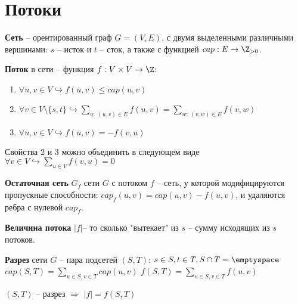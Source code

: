 \section{Потоки}%
\label{sec:Потоки}

\begin{Def}
	\textbf{Сеть} -- орентированный граф $G = (V, E)$, с двумя выделенными различными вершинами: $s$ -- исток и  $t$ -- сток, а также с функцией $cap: E \rightarrow \Z_{>0}$.
\end{Def}

\begin{Def}
	\textbf{Поток} в сети -- функция $f: V \times V \rightarrow \Z$:
	
	\begin{enumerate}
		\item $\forall u, v \in V \hookrightarrow f(u, v) \leq cap(u, v)$
		\item $\forall v \in V \setminus \{s, t\} \hookrightarrow \sum\limits_{u:\ (u, v) \in E} f(u, v) = \sum\limits_{w:\ (v, w) \in E} f(v, w)$
		\item $\forall u, v \in V \hookrightarrow f(u, v) = -f(v, u)$
	\end{enumerate}

	\begin{note}
		Свойства 2 и 3 можно объединить в следующем виде $\forall v \in V \hookrightarrow \sum\limits_{u \in V} f(v, u) = 0$
	\end{note}
\end{Def}


\begin{Def}
	\textbf{Остаточная сеть} $G_f$ сети  $G$ с потоком $f$ -- сеть, у которой модифицируются пропускные способности:  $cap_f(u, v) = cap(u, v) - f(u, v)$, и удаляются ребра с нулевой  $cap_f$.
\end{Def}

\begin{Def}
	\textbf{Величина потока} $\lvert f \rvert$-- то сколько "вытекает" из $s$ -- сумму исходящих из  $s$ потоков.
\end{Def}

\begin{Def}
	\textbf{Разрез} сети $G$ -- пара подсетей $(S, T)$:  $s \in S, t \in T, S \cap T = \emptyspace$ 
	$cap(S, T) = \sum\limits_{u \in S, v \in T} cap(u, v)$ 
	$f(S, T) = \sum\limits_{u \in S, v \in T} f(u, v)$
\end{Def}

\begin{lemma}
	$(S, T)$ -- разрез $\Rightarrow$ $\lvert f \rvert = f(S, T)$
\end{lemma}

